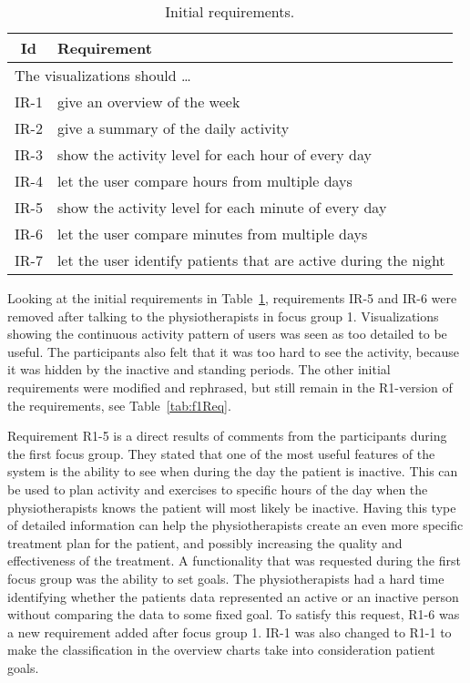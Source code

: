 \begin{table}[h!]
  \begin{center}
  \begin{tabular}{|c|p{12cm}|}
    \hline
      \textbf{Id} & \textbf{Requirement} \\ \hline
    \multicolumn{2}{|l|}{The visualizations should \ldots} \\ \hline
      IR-1 & give an overview of the week \\ \hline
      IR-2 & give a summary of the daily activity \\ \hline
      IR-3 & show the activity level for each hour of every day \\ \hline
      IR-4 & let the user compare hours from multiple days \\ \hline
      IR-5 & show the activity level for each minute of every day \\ \hline
      IR-6 & let the user compare minutes from multiple days \\ \hline
      IR-7 & let the user identify patients that are active during the night \\ \hline
  \end{tabular}
  \end{center}
  \caption[Initial requirements]{Initial requirements.}
  \label{tab:initReq}
\end{table}

Looking at the initial requirements in Table~\ref{tab:initReq}, requirements IR-5 and IR-6 were removed after talking to the physiotherapists in focus group 1. Visualizations showing the continuous activity pattern of users was seen as too detailed to be useful. The participants also felt that it was too hard to see the activity, because it was hidden by the inactive and standing periods. The other initial requirements were modified and rephrased, but still remain in the R1-version of the requirements, see Table~\ref{tab:f1Req}. 

Requirement R1-5 is a direct results of comments from the participants during the first focus group. They stated that one of the most useful features of the system is the ability to see when during the day the patient is inactive. This can be used to plan activity and exercises to specific hours of the day when the physiotherapists knows the patient will most likely be inactive. Having this type of detailed information can help the physiotherapists create an even more specific treatment plan for the patient, and possibly increasing the quality and effectiveness of the treatment. A functionality that was requested during the first focus group was the ability to set goals. The physiotherapists had a hard time identifying whether the patients data represented an active or an inactive person without comparing the data to some fixed goal. To satisfy this request, R1-6 was a new requirement added after focus group 1. IR-1 was also changed to R1-1 to make the classification in the overview charts take into consideration patient goals.


